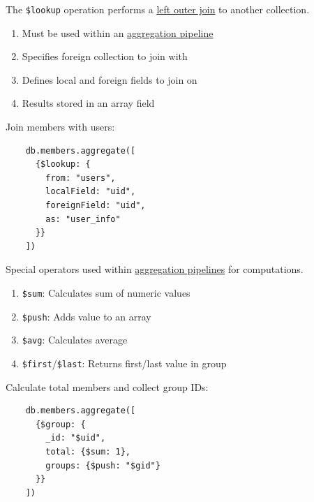 \begin{definition}[\$lookup]
  \label{def:lookup}
  The \texttt{\$lookup} operation performs a \hyperref[def:left-outer-join-2]{left outer join} to another collection.
  \begin{enumerate}
    \item Must be used within an \hyperref[def:aggregation-pipeline]{aggregation pipeline}
    \item Specifies foreign collection to join with
    \item Defines local and foreign fields to join on
    \item Results stored in an array field
  \end{enumerate}
\end{definition}

\begin{example}
  \label{ex:join-operation}
  Join members with users:
  \begin{lstlisting}
    db.members.aggregate([
      {$lookup: {
        from: "users",
        localField: "uid",
        foreignField: "uid",
        as: "user_info"
      }}
    ])
  \end{lstlisting}
\end{example}

\begin{definition}
  \label{def:aggregation-operators}
  Special operators used within \hyperref[def:aggregation-pipeline]{aggregation pipelines} for computations.
  \begin{enumerate}
    \item \texttt{\$sum}: Calculates sum of numeric values
    \item \texttt{\$push}: Adds value to an array
    \item \texttt{\$avg}: Calculates average
    \item \texttt{\$first}/\texttt{\$last}: Returns first/last value in group
  \end{enumerate}
\end{definition}

\begin{example}
  \label{ex:aggregation-operators}
  Calculate total members and collect group IDs:
  \begin{lstlisting}
    db.members.aggregate([
      {$group: {
        _id: "$uid",
        total: {$sum: 1},
        groups: {$push: "$gid"}
      }}
    ])
  \end{lstlisting}
\end{example}


